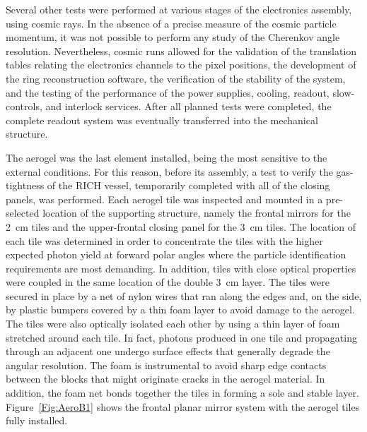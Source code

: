 \documentclass[5p,times,twocolumn]{elsarticle}
\begin{document}
Several other tests were performed at various stages of the electronics assembly, using cosmic rays.
In the absence of a precise measure of the cosmic particle momentum, it was not possible to perform any study of
the Cherenkov angle resolution. Nevertheless, cosmic runs allowed for the validation of the translation tables relating
the electronics channels to the pixel positions, the development of the ring reconstruction software, the verification of
the stability of the system, and the testing of the performance of the power supplies, cooling, readout, slow-controls,
and interlock services. After all planned tests were completed, the complete readout system was eventually transferred
into the mechanical structure.

The aerogel was the last element installed, being the most sensitive to the external conditions. For this reason, before
its assembly, a test to verify the gas-tightness of the RICH vessel, temporarily completed with all of the closing panels,
was performed. Each aerogel tile was inspected and mounted in a pre-selected location of the supporting structure,
namely the frontal mirrors for the 2~cm tiles and the upper-frontal closing panel for the 3~cm tiles. The location of
each tile was determined in order to concentrate the tiles with the higher expected photon yield at forward polar
angles where the particle identification requirements are most demanding. In addition, tiles with close optical
properties were coupled in the same location of the double 3~cm layer. The tiles were secured in place by a net of
nylon wires that ran along the edges and, on the side, by plastic bumpers covered by a thin foam layer to avoid
damage to the aerogel. The tiles were also optically isolated each other by using a thin layer of foam stretched around
each tile. In fact, photons produced in one tile and propagating through an adjacent one undergo surface effects that
generally degrade the angular resolution. The foam is instrumental to avoid sharp edge contacts between the blocks
that might originate cracks in the aerogel material. In addition, the foam net bonds together the tiles in forming a sole
and stable layer. Figure~\ref{Fig:AeroB1} shows the frontal planar mirror system with the aerogel tiles fully installed.
\end{document}
